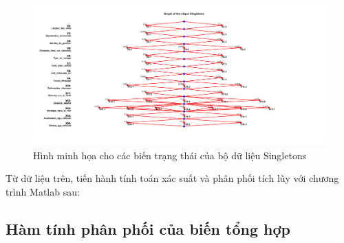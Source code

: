 \begin{figure}[h!]
    \centering
    \includegraphics[width=1.2\textwidth]{../../assets/images/fig_Singletons.png}
    \caption{Hình minh họa cho các biến trạng thái của bộ dữ liệu Singletons}
    \label{fig:Singletons}
\end{figure}

Từ dữ liệu trên, tiến hành tính toán xác suất và phân phối tích lũy với chương trình Matlab sau:

\subsection{Hàm tính phân phối của biến tổng hợp}

